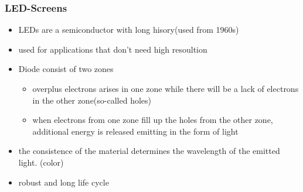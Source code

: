 \documentclass{standalone}
\begin{document}
\subsubsection*{LED-Screens}
\begin{itemize}
\item LEDs are a semiconductor with long hisory(used from 1960s)
\item used for applications that don't need high resoultion
\item Diode consist of two zones
	\begin{itemize}
		\item overplus electrons arises in one zone while there will be a lack of electrons in the other zone(so-called holes)
		\item when electrons from one zone fill up the holes from the other zone, additional energy is released emitting in the form of light
	\end{itemize}
\item the consistence of the material determines the wavelength of the emitted light. (color)
\item robust and long life cycle
\end{itemize}
\end{document}
